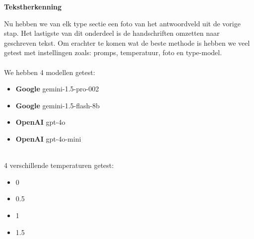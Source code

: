 \documentclass[12pt]{article}
\begin{document}
\noindent
\textbf{Tekstherkenning}
\begin{multicols}{2}
Nu hebben we van elk type sectie een foto van het antwoordveld uit de vorige stap. Het lastigste van dit onderdeel is de handschriften omzetten naar geschreven tekst. Om erachter te komen wat de beste methode is hebben we veel getest met instellingen zoals: promps, temperatuur, foto en type-model.\\
\\
We hebben 4 modellen getest:
\begin{itemize}
    \item \textbf{Google} gemini-1.5-pro-002
    \item \textbf{Google} gemini-1.5-flash-8b
    \item \textbf{OpenAI} gpt-4o
    \item \textbf{OpenAI} gpt-4o-mini
\end{itemize}
\\
4 verschillende temperaturen getest:
\begin{itemize}
    \item 0
    \item 0.5
    \item 1
    \item 1.5
\end{itemize}
\end{multicols}
\pagebreak
\end{document}
